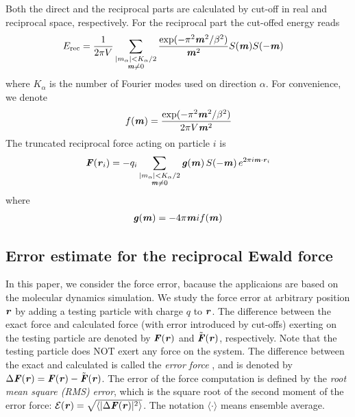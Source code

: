 \documentclass[aps,pre,preprint]{revtex4-1}
\renewcommand{\v}[1]{\textbf{\textit{#1}}}
\begin{document}
Both the direct and the reciprocal parts are calculated by cut-off in
real and reciprocal space, respectively. For the reciprocal part the
cut-offed energy reads
\begin{align}
  E_{\textrm{rec}} & =
  \frac1{2\pi V}
  \sum_{
    \begin{subarray}{c}
      \vert m_\alpha\vert < K_\alpha/2\\
      \v m\neq 0
    \end{subarray}}
  \frac{\exp(-\pi^2\v m^2 / \beta^2)}{\v m^2} S(\v m) S(-\v m)   
\end{align}
where $K_\alpha$ is the number of Fourier modes used on direction
$\alpha$. For convenience, we denote
\begin{align}
  f(\v m) = \frac{\exp(-\pi^2 \v m^2 / \beta^2)}{2\pi V \v m^2}
\end{align}
The truncated reciprocal force acting on particle $i$ is
\begin{align}
  \v F(\v r_i) = - 
  q_i 
  \sum_{
    \begin{subarray}{c}
      \vert m_\alpha\vert < K_\alpha/2\\
      \v m\neq 0
    \end{subarray}}
  \v g(\v m) \,
  S(-\v m)\,
  e^{2\pi i\v m\cdot\v r_i}
\end{align}
where
\begin{align}
  \v g(\v m) = -4 \pi \v m i f(\v m)
\end{align}



\subsection{Error estimate for the reciprocal Ewald force}

In this paper, we consider the force error, bacause the applicaions
are based on the molecular dynamics simulation. We study the force
error at arbitrary position $\v r$ by adding a testing particle with
charge $q$ to $\v r$. The difference between the exact force and
calculated force (with error introduced by cut-offs) exerting on the
testing particle are denoted by $\v F(\v r)$ and $\tilde{\v F}(\v r)$,
respectively. Note that the testing particle does NOT exert any force
on the system. The difference between the exact and calculated is
called the \emph{error force} \cite{short}, and is denoted by $\Delta
\v F(\v r) = \v F(\v r) - \tilde{\v F}(\v r)$.  The error of the force
computation is defined by the \emph{root mean square (RMS)}
\emph{error}, which is the square root of the second moment of the
error force: $\mathcal E(\v r) = \sqrt{\langle\vert\Delta\v F(\v
  r)\vert^2\rangle}$.  The notation $\langle\cdot\rangle$ means
ensemble average.
\end{document}
